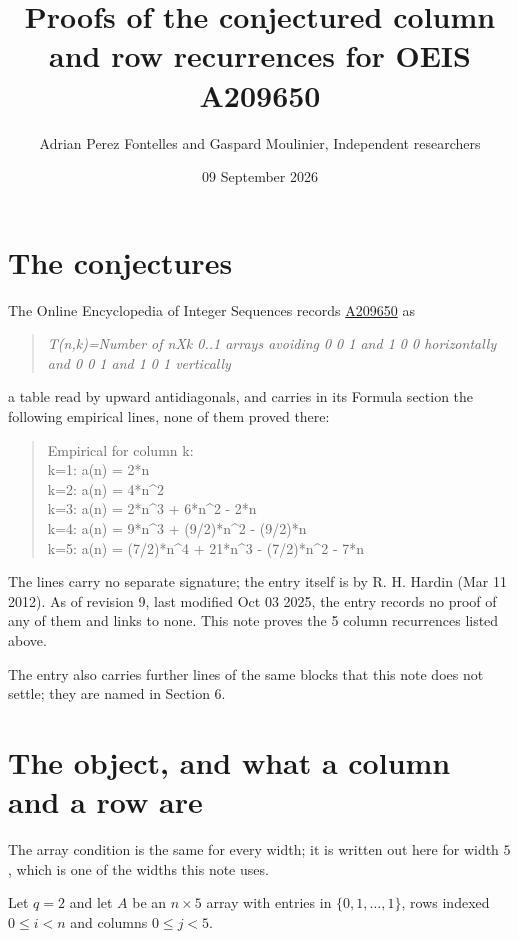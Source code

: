 \documentclass[11pt]{article}
\title{Proofs of the conjectured column and row recurrences for OEIS A209650}
\author{Adrian Perez Fontelles and Gaspard Moulinier, Independent researchers}
\date{09 September 2026}
\theoremstyle{definition}
\begin{document}
\maketitle
\section{The conjectures}

The Online Encyclopedia of Integer Sequences records \href{https://oeis.org/A209650}{A209650} as

\begin{quote}\itshape T(n,k)=Number of nXk 0..1 arrays avoiding 0 0 1 and 1 0 0 horizontally and 0 0 1 and 1 0 1 vertically\end{quote}

a table read by upward antidiagonals, and carries in its Formula section the following empirical lines, none of them proved there:

\begin{quote}\ttfamily Empirical for column k:\\
k=1: a(n) = 2*n\\k=2: a(n) = 4*n\textasciicircum{}2\\k=3: a(n) = 2*n\textasciicircum{}3 + 6*n\textasciicircum{}2 - 2*n\\k=4: a(n) = 9*n\textasciicircum{}3 + (9/2)*n\textasciicircum{}2 - (9/2)*n\\k=5: a(n) = (7/2)*n\textasciicircum{}4 + 21*n\textasciicircum{}3 - (7/2)*n\textasciicircum{}2 - 7*n\end{quote}

The lines carry no separate signature; the entry itself is by R. H. Hardin (Mar 11 2012). As of revision 9, last modified Oct 03 2025, the entry records no proof of any of them and links to none. This note proves the 5 column recurrences listed above.

The entry also carries further lines of the same blocks that this note does not settle; they are named in Section 6.

\section{The object, and what a column and a row are}

The array condition is the same for every width; it is written out here for width $5$, which is one of the widths this note uses.

Let $q = 2$ and let $A$ be an $n \times 5$ array with entries in $\{0,1,\dots,1\}$, rows indexed $0 \le i < n$ and columns $0 \le j < 5$.
\end{document}
